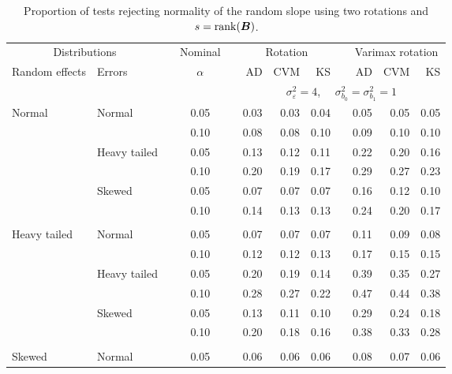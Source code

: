 \begin{table}[ht]
\centering
\caption{\label{tab:simb1sB}Proportion of tests rejecting normality of the random slope using two rotations and $s = \operatorname{rank}(\bm{B})$.}
\begin{scriptsize}
\begin{tabular}{ll p{.1cm} c p{.1cm} rrr p{.1cm} rrr}
  \hline
  \multicolumn{2}{c}{Distributions}& & Nominal & &  \multicolumn{3}{c}{Rotation} & & \multicolumn{3}{c}{Varimax rotation} \\ \cline{1-2} \cline{6-8} \cline{10-12}   
  Random effects & Errors & & $\alpha$ & & AD & CVM & KS & & AD & CVM & KS \\ 
   \hline
& && && \multicolumn{7}{c}{$\sigma_{\varepsilon}^2 = 4$, \ \ $\sigma_{b_0}^2 = \sigma_{b_1}^2 = 1$} \\ \cline{6-12}
\rowcolor{gray!20}Normal       & Normal       && 0.05 &&  0.03 & 0.03 & 0.04 && 0.05 & 0.05 & 0.05 \\ 
\rowcolor{gray!20}             &              && 0.10 &&  0.08 & 0.08 & 0.10 && 0.09 & 0.10 & 0.10 \\ 
\rowcolor{gray!20}             & Heavy tailed && 0.05 &&  0.13 & 0.12 & 0.11 && 0.22 & 0.20 & 0.16 \\ 
\rowcolor{gray!20}             &              && 0.10 &&  0.20 & 0.19 & 0.17 && 0.29 & 0.27 & 0.23 \\ 
\rowcolor{gray!20}             & Skewed       && 0.05 &&  0.07 & 0.07 & 0.07 && 0.16 & 0.12 & 0.10 \\ 
\rowcolor{gray!20}             &              && 0.10 &&  0.14 & 0.13 & 0.13 && 0.24 & 0.20 & 0.17 \\ 
             &&&&&&&&&&&\\
Heavy tailed & Normal       && 0.05 &&  0.07 & 0.07 & 0.07 && 0.11 & 0.09 & 0.08 \\ 
             &              && 0.10 &&  0.12 & 0.12 & 0.13 && 0.17 & 0.15 & 0.15 \\ 
             & Heavy tailed && 0.05 &&  0.20 & 0.19 & 0.14 && 0.39 & 0.35 & 0.27 \\ 
             &              && 0.10 &&  0.28 & 0.27 & 0.22 && 0.47 & 0.44 & 0.38 \\ 
             & Skewed       && 0.05 &&  0.13 & 0.11 & 0.10 && 0.29 & 0.24 & 0.18 \\ 
             &              && 0.10 &&  0.20 & 0.18 & 0.16 && 0.38 & 0.33 & 0.28 \\ 
             &&&&&&&&&&&\\
Skewed       & Normal       && 0.05 &&  0.06 & 0.06 & 0.06 && 0.08 & 0.07 & 0.06 \\ 

\end{tabular}
\end{scriptsize}
\end{table}
